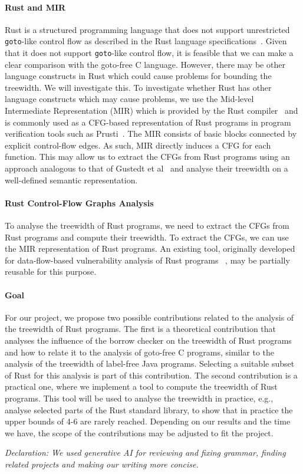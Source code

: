 \documentclass{article}
\begin{document}
\paragraph{Rust and MIR}
Rust is a structured programming language that does not support unrestricted \texttt{goto}-like control flow as described in the Rust language specifications~\cite{rustlang_loop_exprs}.
Given that it does not support \texttt{goto}-like control flow, it is feasible that we can make a clear comparison with the goto-free C language.
However, there may be other language constructs in Rust which could cause problems for bounding the treewidth.
We will investigate this.
To investigate whether Rust has other language constructs which may cause problems, we use the Mid-level Intermediate Representation (MIR) which is provided by the Rust compiler~\cite{rustc_mir} and is commonly used as a CFG-based representation of Rust programs in program verification tools such as Prusti~\cite{prusti}.
The MIR consists of basic blocks connected by explicit control-flow edges.
As such, MIR directly induces a CFG for each function.
This may allow us to extract the CFGs from Rust programs using an approach analogous to that of Gustedt et al~\cite{gustedt_treewidth_2002} and analyse their treewidth on a well-defined semantic representation.

\paragraph{Rust Control-Flow Graphs Analysis}
To analyse the treewidth of Rust programs, we need to extract the CFGs from Rust programs and compute their treewidth.
To extract the CFGs, we can use the MIR representation of Rust programs.
An existing tool, originally developed for data-flow-based vulnerability analysis of Rust programs ~\cite{Budde2024}, may be partially reusable for this purpose.

\paragraph{Goal}
For our project, we propose two possible contributions related to the analysis of the treewidth of Rust programs.
The first is a theoretical contribution that analyses the influence of the borrow checker on the treewidth of Rust programs and how to relate it to the analysis of goto-free C programs, similar to the analysis of the treewidth of label-free Java programs.
Selecting a suitable subset of Rust for this analysis is part of this contribution.
The second contribution is a practical one, where we implement a tool to compute the treewidth of Rust programs.
This tool will be used to analyse the treewidth in practice, e.g., analyse selected parts of the Rust standard library, to show that in practice the upper bounds of 4-6 are rarely reached.
Depending on our results and the time we have, the scope of the contributions may be adjusted to fit the project.

\vspace{1em}

\noindent\textit{Declaration: We used generative AI for reviewing and fixing grammar, finding related projects and making our writing more concise.}

\printbibliography
\end{document}
